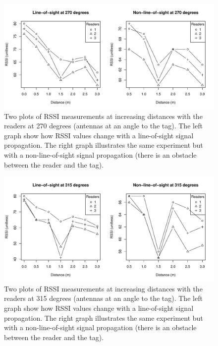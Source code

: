 \documentclass[a4paper,12pt]{article}
\begin{document}
\begin{figure}
	\begin{center}
		\includegraphics[width=1\textwidth]{rssi_distance_3m_270deg}
		\caption{Two plots of RSSI measurements at increasing distances with the readers at 270 degrees (antennas at an angle to the tag). The left graph show how RSSI values change with a line-of-sight signal propagation. The right graph illustrates the same experiment but with a non-line-of-sight signal propagation (there is an obstacle between the reader and the tag).}
	\end{center}
\end{figure}
\begin{figure}
	\begin{center}
		\includegraphics[width=1\textwidth]{rssi_distance_3m_315deg}
		\caption{Two plots of RSSI measurements at increasing distances with the readers at 315 degrees (antennas at an angle to the tag). The left graph show how RSSI values change with a line-of-sight signal propagation. The right graph illustrates the same experiment but with a non-line-of-sight signal propagation (there is an obstacle between the reader and the tag).}
	\end{center}
\end{figure}
\end{document}
